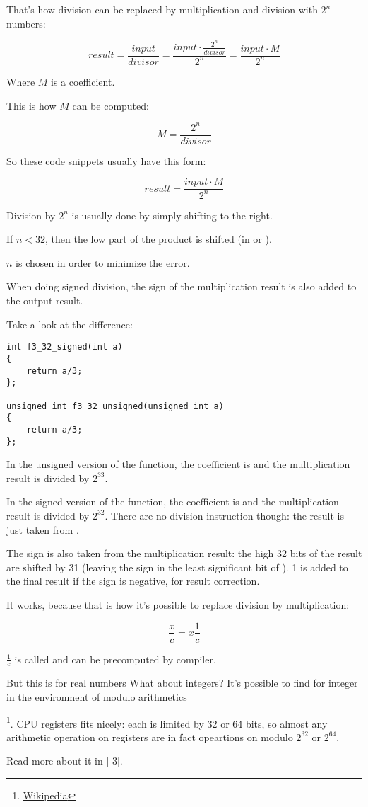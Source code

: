 ﻿

That's how division can be replaced by multiplication and division with $2^{n}$ numbers:

\[
	result = 
	\frac{input}{divisor} = 
	\frac{input \cdot \frac{2^{n}}{divisor}}{2^{n}} = 
	\frac{input \cdot M}{2^{n}}
\]

Where $M$ is a  coefficient.

This is how $M$ can be computed:

\[
	M = \frac{2^{n}}{divisor}
\]

So these code snippets usually have this form:

\[
	result = \frac{input \cdot M}{2^{n}}
\]

%
Division by $2^{n}$ is usually done by simply shifting to the right.

If $n<32$, then the low part of the \gls{product} is shifted (in \EAX or \RAX).

$n$ is chosen in order to minimize the error.

When doing signed division, the sign of the multiplication result is also added to the output result.

Take a look at the difference:

\begin{lstlisting}
int f3_32_signed(int a)
{
	return a/3;
};

unsigned int f3_32_unsigned(unsigned int a)
{
	return a/3;
};
\end{lstlisting}

In the unsigned version of the function, the  coefficient is  
and the multiplication result is divided by $2^{33}$.

In the signed version of the function, the  coefficient is  
and the multiplication result is divided by $2^{32}$.
There are no division instruction though: the result is just taken from \EDX. 

The sign is also taken from the multiplication result: the high 32 bits of the result are shifted by 31
(leaving the sign in the least significant bit of \EAX).
1 is added to the final result if the sign is negative, for result correction.




It works, because that is how it's possible to replace division by multiplication:

\[
	\frac{x}{c} = x\frac{1}{c}
\]

$\frac{1}{c}$ is called  and can be precomputed by compiler.

But this is for real numbers
What about integers?
It's possible to find  for integer in the environment of modulo arithmetics

\footnote{\href{http://go.yurichev.com/17359}{Wikipedia}}.
\ac{CPU} registers fits nicely: each is limited by 32 or 64 bits, so almost any arithmetic operation on registers are in fact
opeartions on modulo $2^{32}$ or $2^{64}$.

Read more about it in [-3].
